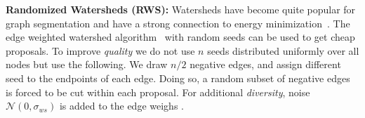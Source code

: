 \documentclass[10pt,twocolumn,letterpaper]{article}
\theoremstyle{definition}
\begin{document}
%

\noindent \textbf{Randomized Watersheds (RWS):}
Watersheds have become quite popular for
graph segmentation and have a strong connection
to energy minimization~\cite{couprie_2011}.
%
The edge weighted watershed algorithm~\cite{meyer_2013}
with random seeds can be used to get
cheap proposals.
To improve \emph{quality} we do not use $n$ seeds distributed uniformly
over all nodes but use the following.
%
We draw $n/2$ negative edges, and assign different seed to the endpoints
of each edge.
Doing so, a random subset of negative edges is forced
to be cut within each proposal.
For additional \emph{diversity}, noise $\mathcal{N} (0, \sigma_{ws})$
is added to the edge weighs \cite{straehle_2012}.

%


\end{document}
